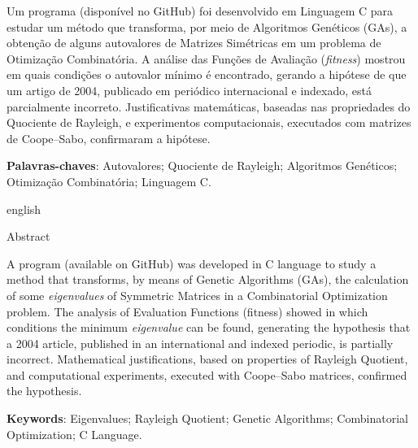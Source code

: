 \thispagestyle{empty}
\begin{resumo}
Um programa (disponível no GitHub) foi desenvolvido em Linguagem C para estudar um método que transforma, por meio de Algoritmos Genéticos (GAs), a obtenção de alguns autovalores de Matrizes Simétricas em um problema de Otimização Combinatória. A análise das Funções de Avaliação (\emph{fitness}) mostrou em quais condições o autovalor mínimo é encontrado, gerando a hipótese de que um artigo de 2004, publicado em periódico internacional e indexado, está parcialmente incorreto. Justificativas matemáticas, baseadas nas propriedades do Quociente de Rayleigh, e experimentos computacionais, executados com matrizes de Coope--Sabo, confirmaram a hipótese.
     
    \vspace{\onelineskip}

    \noindent\textbf{Palavras-chaves}: Autovalores; Quociente de Rayleigh; Algoritmos Genéticos; Otimização Combinatória; Linguagem C.

    \vspace{\onelineskip}
    \vspace{\onelineskip}
		
    \begin{otherlanguage*}{english}
    \begin{center}{\ABNTEXchapterfont\huge Abstract}\end{center}
    
    A program (available on GitHub) was developed in C language to study a method that transforms, by means of Genetic Algorithms (GAs), the calculation of some \emph{eigenvalues} of Symmetric Matrices in a Combinatorial Optimization problem. The analysis of Evaluation Functions (fitness) showed in which conditions the minimum \emph{eigenvalue} can be found, generating the hypothesis that a 2004 article, published in an international and indexed periodic, is partially incorrect. Mathematical justifications, based on properties of Rayleigh Quotient, and computational experiments, executed with Coope--Sabo matrices, confirmed the hypothesis.
		
    \vspace{\onelineskip}

    \noindent\textbf{Keywords}: Eigenvalues; Rayleigh Quotient; Genetic Algorithms; Combinatorial Optimization; C Language.

    \end{otherlanguage*}
		

\end{resumo}
